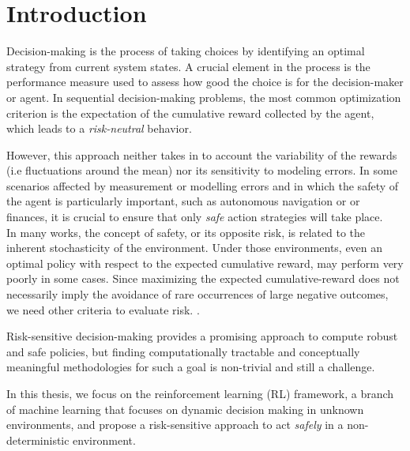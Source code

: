 \chapter{Introduction}
\label{sec:introduction}


Decision-making is the process of taking choices by identifying an optimal strategy
from current system states. A crucial element in the process is the performance measure used
to assess how good the choice is for the decision-maker or agent.
In sequential decision-making problems, the most common optimization criterion is the 
expectation of the cumulative reward collected by the agent, which leads to a \textit{risk-neutral}
behavior.

However, this approach neither takes in to account the variability of the rewards (i.e fluctuations around the mean)
nor its sensitivity to modeling errors. In some scenarios affected by measurement or modelling errors and
in which the safety of the agent is particularly important, such as autonomous navigation or
or finances, it is crucial to ensure that
only \textit{safe} action strategies will take place.\\
In many works, the concept of safety, or its opposite risk, is related to the inherent
stochasticity of the environment.
Under those environments, even an optimal policy with respect to the expected 
cumulative reward, may perform very poorly in some cases. Since maximizing the expected
cumulative-reward does not necessarily imply the avoidance of rare occurrences of large negative outcomes,
we need other criteria to evaluate risk. \citep{Garcia2015}.

Risk-sensitive decision-making provides a promising
approach to compute robust and safe policies, but
finding computationally tractable and conceptually meaningful methodologies for such a goal is non-trivial
and still a challenge.

In this thesis, we focus on the reinforcement learning (RL) framework, a branch of machine learning
that focuses on dynamic decision making in unknown environments, and propose a risk-sensitive approach
to act \textit{safely} in a non-deterministic environment.






